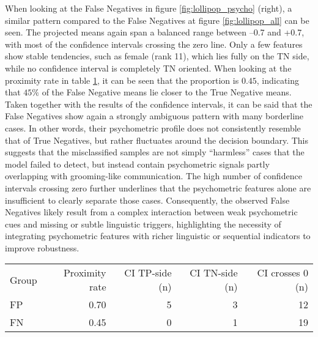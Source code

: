 When looking at the False Negatives in figure \ref{fig:lollipop_psycho} (right), a similar pattern compared to the False Negatives at figure \ref{fig:lollipop_all} can be seen. The projected means again span a balanced range between –0.7 and +0.7, with most of the confidence intervals crossing the zero line. Only a few features show stable tendencies, such as female  (rank 11), which lies fully on the TN side, while no confidence interval is completely TN oriented. When looking at the proximity rate in table \ref{tab:proximity_key_results_psycho}, it can be seen that the proportion is $0.45$, indicating that $45\%$ of the False Negative means lie closer to the True Negative means. Taken together with the results of the confidence intervals, it can be said that the False Negatives show again a strongly ambiguous pattern with many borderline cases.  In other words, their psychometric profile does not consistently resemble that of True Negatives, but rather fluctuates around the decision boundary. This suggests that the misclassified samples are not simply ``harmless'' cases that the model failed to detect, but instead contain psychometric signals partly overlapping with grooming-like communication. The high number of confidence intervals crossing zero further underlines that the psychometric features alone are insufficient to clearly separate those cases. Consequently, the observed False Negatives likely result from a complex interaction between weak psychometric cues and missing or subtle linguistic triggers, highlighting the necessity of integrating psychometric features with richer linguistic or sequential indicators to improve robustness.  


\begin{table}[H]
\centering
{}
\label{tab:proximity_key_results_psycho}
\begin{tabular}{@{}lrrrr@{}}
\toprule
Group & Proximity rate & CI TP-side (n) & CI TN-side (n) & CI crosses 0 (n) \\
\cmidrule(lr){2-5}
FP & 0.70 & 5 & 3 & 12 \\
FN & 0.45 & 0 & 1 & 19 \\
\bottomrule
\end{tabular}
\end{table}









